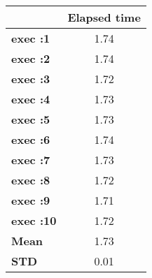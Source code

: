 \begin{tiny}\begin{tabular}{|l|c|}
\hline
&\textbf{Elapsed time}\\\hline
\textbf{exec :1}&1.74\\\hline
\textbf{exec :2}&1.74\\\hline
\textbf{exec :3}&1.72\\\hline
\textbf{exec :4}&1.73\\\hline
\textbf{exec :5}&1.73\\\hline
\textbf{exec :6}&1.74\\\hline
\textbf{exec :7}&1.73\\\hline
\textbf{exec :8}&1.72\\\hline
\textbf{exec :9}&1.71\\\hline
\textbf{exec :10}&1.72\\\hline
\textbf{ Mean}&1.73\\\hline
\textbf{ STD}&0.01\\\hline
\end{tabular}
\end{tiny}